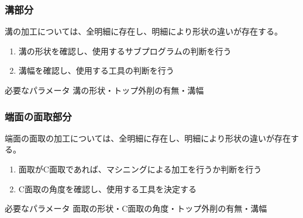 \subsubsection{溝部分}
溝の加工については、全明細に存在し、明細により形状の違いが存在する。
\begin{enumerate}
\item {}溝の形状を確認し、使用するサブプログラムの判断を行う
\item {}溝幅を確認し、使用する工具の判断を行う
\end{enumerate}
\begin{Parameter}{必要なパラメータ}
溝の形状・トップ外削の有無・溝幅
\end{Parameter}

\subsubsection{端面の面取部分}
端面の面取の加工については、全明細に存在し、明細により形状の違いが存在する。
\begin{enumerate}
\item 面取がC面取であれば、マシニングによる加工を行うか判断を行う
    \item {}C面取の角度を確認し、使用する工具を決定する
\end{enumerate}
\begin{Parameter}{必要なパラメータ}
面取の形状・C面取の角度・トップ外削の有無・溝幅
\end{Parameter}

